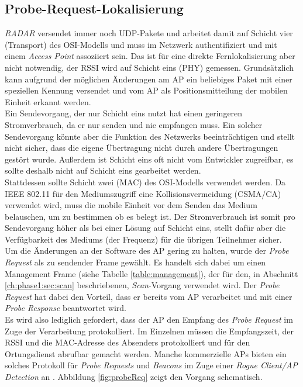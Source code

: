 \subsection{Probe-Request-Lokalisierung}
\label{ch:phase2:sec:anpassungbereich}
\emph{RADAR} versendet immer noch UDP-Pakete und arbeitet damit auf Schicht vier (Transport) des OSI-Modells und muss im Netzwerk authentifiziert und mit einem \emph{Access Point} assoziiert sein.
Das ist für eine direkte Fernlokalisierung aber nicht notwendig, der RSSI wird auf Schicht eins (PHY) gemessen.
Grundsätzlich kann aufgrund der möglichen Änderungen am AP ein beliebiges Paket mit einer speziellen Kennung versendet und vom AP als Positionsmitteilung der mobilen Einheit erkannt werden. \\
Ein Sendevorgang, der nur Schicht eins nutzt hat einen geringeren Stromverbrauch, da er nur senden und nie empfangen muss.
Ein solcher Sendevorgang könnte aber die Funktion des Netzwerks beeinträchtigen und stellt nicht sicher, dass die eigene Übertragung nicht durch andere Übertragungen gestört wurde.
Außerdem ist Schicht eins oft nicht vom Entwickler zugreifbar, es sollte deshalb nicht auf Schicht eins gearbeitet werden.\\
Stattdessen sollte Schicht zwei (MAC) des OSI-Modells verwendet werden. 
Da IEEE 802.11 für den Mediumszugriff eine Kollisionsvermeidung (CSMA/CA) verwendet wird, muss die mobile Einheit vor dem Senden das Medium belauschen, um zu bestimmen ob es belegt ist.
Der Stromverbrauch ist somit pro Sendevorgang höher als bei einer Lösung auf Schicht eins, stellt dafür aber die Verfügbarkeit des Mediums (der Frequenz) für die übrigen Teilnehmer sicher. \\
Um die Änderungen an der Software des AP gering zu halten, wurde der \emph{Probe Request} als zu sendender Frame gewählt.
Es handelt sich dabei um einen Management Frame (siehe Tabelle \ref{table:management}), der für den, in Abschnitt \ref{ch:phase1:sec:scan} beschriebenen, \emph{Scan}-Vorgang verwendet wird.
Der \emph{Probe Request} hat dabei den Vorteil, dass er bereits vom AP verarbeitet und mit einer \emph{Probe Response} beantwortet wird. \\
Es wird also lediglich gefordert, dass der AP den Empfang des \emph{Probe Request} im Zuge der Verarbeitung protokolliert. 
Im Einzelnen müssen die Empfangszeit, der RSSI und die MAC-Adresse des Absenders protokolliert und für den Ortungsdienst abrufbar gemacht werden. 
Manche kommerzielle APs bieten ein solches Protokoll für \emph{Probe Requests} und \emph{Beacons} im Zuge einer \textit{Rogue Client/AP Detection} an \cite{lancom2017rouge}.
Abbildung \ref{fig:probeReq} zeigt den Vorgang schematisch.\\

